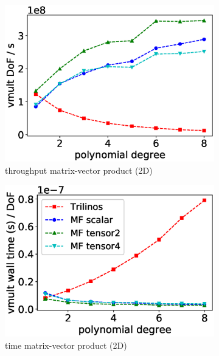 \documentclass[AMA,STIX1COL]{WileyNJD-v2}
\begin{document}
\begin{figure}
  \centering
  \begin{subfigure}[b]{0.32\textwidth}
      \centering
      \includegraphics[width=\textwidth]{IWR_newest_patched_throughput2d-nolables.eps}
      \caption{throughput matrix-vector product (2D)}
  \end{subfigure}
  \begin{subfigure}[b]{0.32\textwidth}
      \centering
      \includegraphics[width=\textwidth]{IWR_newest_patched_timing2d.eps}
      \caption{time matrix-vector product (2D)}
      \label{fig:benchmark_miehe_IWR_vmult2}
  \end{subfigure}
  \begin{subfigure}[b]{0.32\textwidth}

\end{subfigure}
\end{figure}
\end{document}
